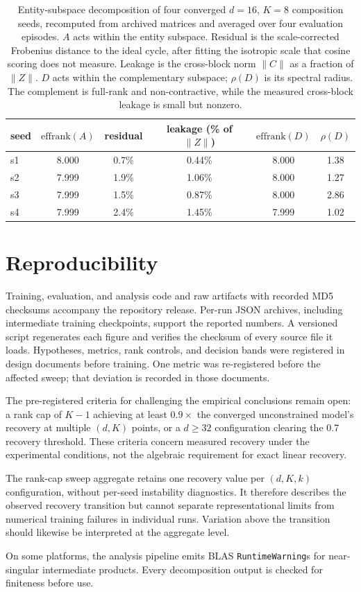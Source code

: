 \begin{table}[H]
\centering
\small
\begin{tabular}{lccccc}
\toprule
seed & $\mathrm{effrank}(A)$ & residual & leakage (\% of $\|Z\|$) & $\mathrm{effrank}(D)$ & $\rho(D)$ \\
\midrule
s1 & 8.000 & 0.7\% & 0.44\% & 8.000 & 1.38 \\
s2 & 7.999 & 1.9\% & 1.06\% & 8.000 & 1.27 \\
s3 & 7.999 & 1.5\% & 0.87\% & 8.000 & 2.86 \\
s4 & 7.999 & 2.4\% & 1.45\% & 7.999 & 1.02 \\
\bottomrule
\end{tabular}
\caption{Entity-subspace decomposition of four converged $d{=}16$, $K{=}8$
composition seeds, recomputed from archived matrices and averaged
over four evaluation episodes. $A$ acts within the entity subspace.
Residual is the scale-corrected Frobenius distance to the ideal cycle,
after fitting the isotropic scale that cosine scoring does not
measure. Leakage is the cross-block norm $\|C\|$ as a fraction of
$\|Z\|$. $D$ acts within the complementary subspace;
$\rho(D)$ is its spectral radius. The complement is full-rank and
non-contractive, while the measured cross-block leakage is small
but nonzero.}
\label{tab:subspace}
\end{table}

\section{Reproducibility}
\label{app:repro}

Training, evaluation, and analysis code and raw artifacts with
recorded MD5 checksums accompany the repository release. Per-run
JSON archives, including intermediate training checkpoints, support
the reported numbers. A versioned script regenerates each figure
and verifies the checksum of every source file it loads. Hypotheses,
metrics, rank controls, and decision bands were registered in design
documents before training. One metric was re-registered before the
affected sweep; that deviation is recorded in those documents.

The pre-registered criteria for challenging the empirical conclusions
remain open: a rank cap of $K{-}1$ achieving at least
$0.9\times$ the converged unconstrained model's recovery at multiple
$(d, K)$ points, or a $d \geq 32$ configuration clearing the 0.7 recovery
threshold. These criteria concern measured recovery under the
experimental conditions, not the algebraic requirement for exact
linear recovery.

The rank-cap sweep aggregate retains one recovery value per
$(d, K, k)$ configuration, without per-seed instability diagnostics.
It therefore describes the observed recovery transition but cannot
separate representational limits from numerical training failures
in individual runs. Variation above the transition should likewise
be interpreted at the aggregate level.

On some platforms, the analysis pipeline emits BLAS
\texttt{RuntimeWarning}s for near-singular intermediate products.
Every decomposition output is checked for finiteness before use.
